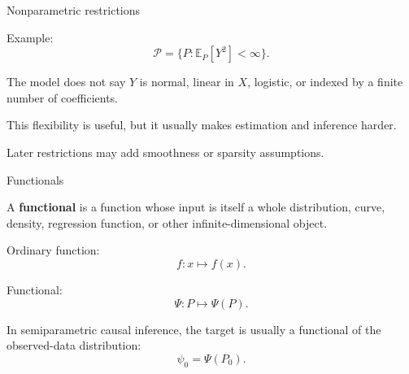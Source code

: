 \documentclass[xcolor={table}, handout]{beamer}
\begin{document}
\note{
\scriptsize \singlespacing

}
\begin{frame}{Nonparametric restrictions}

\begin{wideitemize}
\item Example:
\[
\mathcal{P}
  =
  \{P: \mathbb{E}_P[Y^2]<\infty\}.
\]\pause
\item The model does not say $Y$ is normal, linear in $X$, logistic, or indexed by a finite number of coefficients.\pause
\item This flexibility is useful, but it usually makes estimation and inference harder.
\item Later restrictions may add smoothness or sparsity assumptions.
\end{wideitemize}

\end{frame}

\note{
\scriptsize \singlespacing

}

\begin{frame}{Functionals}

\begin{wideitemize}
\item A \textbf{functional} is a function whose input is itself a whole distribution, curve, density, regression function, or other infinite-dimensional object.\pause
\item Ordinary function:
\[
f:x\mapsto f(x).
\]\pause
\item Functional:
\[
\Psi:P\mapsto \Psi(P).
\]\pause
\item In semiparametric causal inference, the target is usually a functional of the observed-data distribution:
\[
\psi_0=\Psi(P_0).
\]
\end{wideitemize}

\end{frame}
\end{document}
